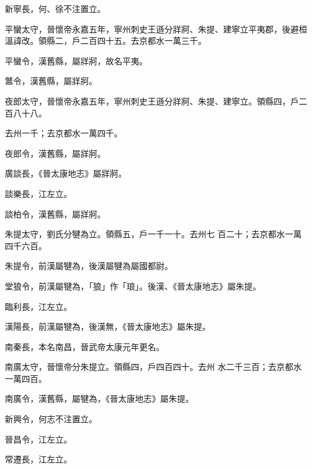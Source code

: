 \begin{pinyinscope}
 新寧長，何、徐不注置立。



 平蠻太守，晉懷帝永嘉五年，寧州刺史王遜分牂牁、朱提、建寧立平夷郡，後避桓溫諱改。領縣二，戶二百四十五。去京都水一萬三千。



 平蠻令，漢舊縣，屬牂牁，故名平夷。



 鄨令，漢舊縣，屬牂牁。



 夜郎太守，晉懷帝永嘉五年，寧州刺史王遜分牂牁、朱提、建寧立。領縣四，戶二百八十八。



 去州一千；去京都水一萬四千。



 夜郎令，漢舊縣，屬牂牁。



 廣談長，《晉太康地志》屬牂牁。



 談樂長，江左立。



 談柏令，漢舊縣，屬牂牁。



 朱提太守，劉氏分犍為立。領縣五，戶一千一十。去州七
 百二十；去京都水一萬四千六百。



 朱提令，前漢屬犍為，後漢屬犍為屬國都尉。



 堂狼令，前漢屬犍為，「狼」作「琅」。後漢、《晉太康地志》屬朱提。



 臨利長，江左立。



 漢陽長，前漢屬犍為，後漢無，《晉太康地志》屬朱提。



 南秦長，本名南昌，晉武帝太康元年更名。



 南廣太守，晉懷帝分朱提立。領縣四，戶四百四十。去州
 水二千三百；去京都水一萬四百。



 南廣令，漢舊縣，屬犍為，《晉太康地志》屬朱提。



 新興令，何志不注置立。



 晉昌令，江左立。



 常遷長，江左立。




\end{pinyinscope}
